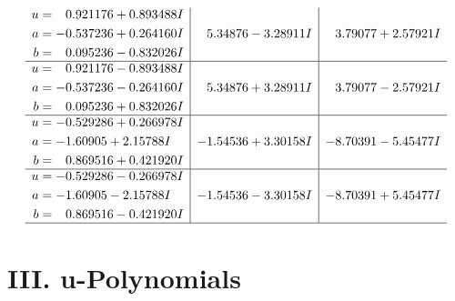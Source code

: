\documentclass[1p]{elsarticle_modified}
\theoremstyle{definition}
\begin{document}
$$\begin{array}{c|c|c}
\begin{aligned}
u &= \phantom{-}0.921176 + 0.893488 I \\
a &= -0.537236 + 0.264160 I \\
b &= \phantom{-}0.095236 - 0.832026 I\end{aligned}
 & \phantom{-}5.34876 - 3.28911 I & \phantom{-}3.79077 + 2.57921 I \\ \hline\begin{aligned}
u &= \phantom{-}0.921176 - 0.893488 I \\
a &= -0.537236 - 0.264160 I \\
b &= \phantom{-}0.095236 + 0.832026 I\end{aligned}
 & \phantom{-}5.34876 + 3.28911 I & \phantom{-}3.79077 - 2.57921 I \\ \hline\begin{aligned}
u &= -0.529286 + 0.266978 I \\
a &= -1.60905 + 2.15788 I \\
b &= \phantom{-}0.869516 + 0.421920 I\end{aligned}
 & -1.54536 + 3.30158 I & -8.70391 - 5.45477 I \\ \hline\begin{aligned}
u &= -0.529286 - 0.266978 I \\
a &= -1.60905 - 2.15788 I \\
b &= \phantom{-}0.869516 - 0.421920 I\end{aligned}
 & -1.54536 - 3.30158 I & -8.70391 + 5.45477 I\\
 \hline 
 \end{array}$$\newpage
\newpage\renewcommand{\arraystretch}{1}
\centering \section*{ III. u-Polynomials}
\end{document}

